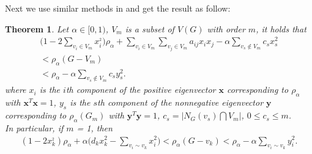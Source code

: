 \documentclass[amsthm]{elsart}
\newtheorem{theorem}{Theorem}[section]
\begin{document}
Next we use similar methods in \cite{2012Bounds} and get the result as follow:
\begin{theorem} \label{the:1}
Let $\alpha \in [0, 1)$, $V_m$ is a subset of $V(G)$ with order $m$, it holds that
\begin{eqnarray} \label{equ:1}
\nonumber \big(1 - 2\sum \limits_{v_i \in V_m}^{} x_i^{_2} \big) \rho_\alpha
+ \sum \limits_{v_i \in V_m}^{} \sum \limits_{v_j \in V_m}^{} a_{ij}x_ix_j
- \alpha \sum \limits_{v_s \notin V_m}^{} c_s x_s^2
\\ \nonumber < \rho_\alpha(G - V_m) \qquad \;\,
\\  <  \rho_\alpha - \alpha \sum \limits_{v_s \notin V_m}^{} c_s y_s^2.
\end{eqnarray}
where $x_i$ is the $i$th component of the positive eigenvector $\textbf{x}$ corresponding to $\rho_\alpha$ with $\textbf{x}^T\textbf{x} = 1$, $y_s$ is the $s$th component of the nonnegative eigenvector $\textbf{y}$  corresponding to $\rho_\alpha(G_m)$ with $\textbf{y}^T\textbf{y} = 1$, $ c_s = |N_G(v_s) \bigcap V_m|$, $0\leqslant c_s \leqslant m$.
\\ In particular, if $m$ = 1, then
\begin{eqnarray} \label{equ:2}
(1 - 2x_k^{_2})\rho_\alpha
+ \alpha \big(d_k x_k^2 - \sum \limits_{v_i \sim v_k}^{} x_i^2 \big)
< \rho_\alpha(G - v_k)
<  \rho_\alpha - \alpha \sum \limits_{v_i \sim v_k}^{} y_i^2.
\end{eqnarray}
\end{theorem}
\end{document}
